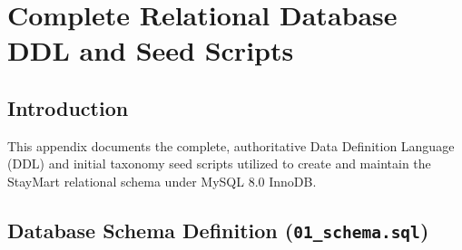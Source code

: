 \chapter{Complete Relational Database DDL and Seed Scripts}

\section{Introduction}
This appendix documents the complete, authoritative Data Definition Language (DDL) and initial taxonomy seed scripts utilized to create and maintain the StayMart relational schema under MySQL 8.0 InnoDB.

\section{Database Schema Definition (\texttt{01\_schema.sql})}
